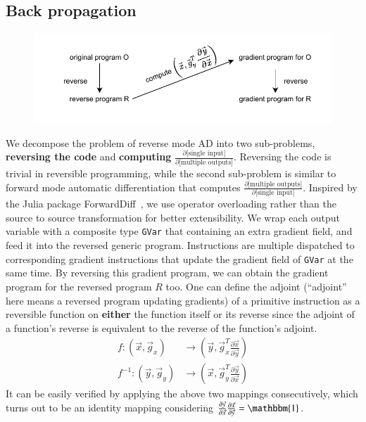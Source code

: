\documentclass{article}
\newcommand{\<}{\langle}
\renewcommand{\>}{\rangle}
\renewcommand{\cite}[1]{{\citep{#1}}}
\theoremstyle{definition}\newtheorem{definition}{\textit{Definition}}
\begin{document}
\subsection{Back propagation}
\begin{figure}[h!]
    \centerline{\includegraphics[width=0.8\columnwidth,trim={0 0cm 0 0},clip]{autodiff.pdf}}
\end{figure}
We decompose the problem of reverse mode AD into two sub-problems, \textbf{reversing the code} and \textbf{computing} $\frac{\partial \text{[single input]}}{\partial \text{[multiple outputs]}}$.
Reversing the code is trivial in reversible programming, while the second sub-problem is similar to forward mode automatic differentiation that computes $\frac{\partial \text{[multiple outputs]}}{\partial \text{[single input]}}$.
Inspired by the Julia package ForwardDiff~\cite{Revels2016}, we use operator overloading rather than the source to source transformation for better extensibility.
We wrap each output variable with a composite type \texttt{GVar} that containing an extra gradient field, and feed it into the reversed generic program.
Instructions are multiple dispatched to corresponding gradient instructions that update the gradient field of \texttt{GVar} at the same time. By reversing this gradient program, we can obtain the gradient program for the reversed program $R$ too.
One can define the adjoint (``adjoint'' here means a reversed program updating gradients) of a primitive instruction as a reversible function on \textbf{either} the function itself or its reverse since the adjoint of a function's reverse is equivalent to the reverse of the function's adjoint.
\begin{align}
    f: (\vec x, \vec g_x) &\rightarrow (\vec y, \vec g_x^T\frac{\partial \vec x}{\partial \vec y})\\
    f^{-1}: (\vec y, \vec g_y) &\rightarrow (\vec x, \vec g_y^T\frac{\partial \vec y}{\partial \vec x})
\end{align}
It can be easily verified by applying the above two mappings consecutively, which turns out to be an identity mapping considering $\frac{\partial \vec y}{\partial \vec x} \frac{\partial \vec x}{\partial \vec y} = \mathbbm{1}$.
\end{document}
